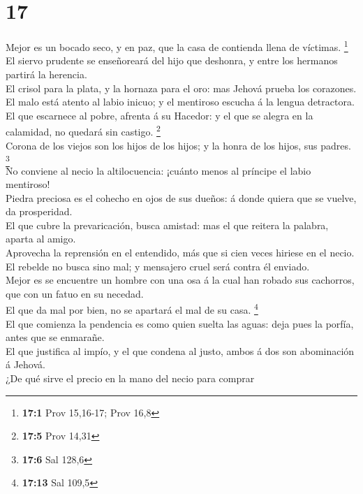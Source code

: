 \hypertarget{section-16}{%
\section{17}\label{section-16}}

 Mejor es un bocado seco, y en paz, que la casa de contienda
llena de víctimas. \footnote{\textbf{17:1} Prov 15,16-17; Prov 16,8}\\
 El siervo prudente se enseñoreará del hijo que deshonra, y
entre los hermanos partirá la herencia.\\
 El crisol para la plata, y la hornaza para el oro: mas
Jehová prueba los corazones.\\
 El malo está atento al labio inicuo; y el mentiroso escucha
á la lengua detractora.\\
 El que escarnece al pobre, afrenta á su Hacedor: y el que
se alegra en la calamidad, no quedará sin castigo. \footnote{\textbf{17:5}
  Prov 14,31}\\
 Corona de los viejos son los hijos de los hijos; y la honra
de los hijos, sus padres. \footnote{\textbf{17:6} Sal 128,6}\\
 No conviene al necio la altilocuencia: ¡cuánto menos al
príncipe el labio mentiroso!\\
 Piedra preciosa es el cohecho en ojos de sus dueños: á
donde quiera que se vuelve, da prosperidad.\\
 El que cubre la prevaricación, busca amistad: mas el que
reitera la palabra, aparta al amigo.\\
 Aprovecha la reprensión en el entendido, más que si cien
veces hiriese en el necio.\\
 El rebelde no busca sino mal; y mensajero cruel será
contra él enviado.\\
 Mejor es se encuentre un hombre con una osa á la cual han
robado sus cachorros, que con un fatuo en su necedad.\\
 El que da mal por bien, no se apartará el mal de su casa.
\footnote{\textbf{17:13} Sal 109,5}\\
 El que comienza la pendencia es como quien suelta las
aguas: deja pues la porfía, antes que se enmarañe.\\
 El que justifica al impío, y el que condena al justo,
ambos á dos son abominación á Jehová.\\
 ¿De qué sirve el precio en la mano del necio para comprar
